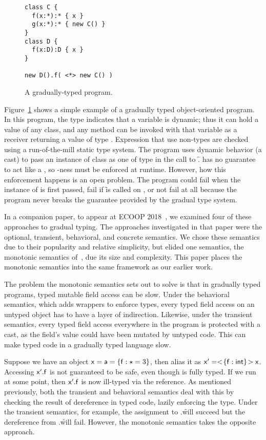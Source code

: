 \documentclass[sigconf]{acmart}
\begin{document}
\begin{figure}[h]
\begin{lstlisting}
class C { 
  f(x:*):* { x } 
  g(x:*):* { new C() }
}
class D { 
  f(x:D):D { x }
}

new D().f( <*> new C() )
\end{lstlisting}
\caption{A gradually-typed program.}
\label{fig:simpleprog}
\end{figure}

Figure~\ref{fig:simpleprog} shows a simple example of a gradually typed
object-oriented program. In this program, the type \any indicates that a
variable is dynamic; thus it can hold a value of any class, and any method
can be invoked with that variable as a receiver returning a value of type
\any. Expression that use non-\any types are checked using a run-of-the-mill
static type system. The program uses dynamic behavior (a cast) to pass an
instance of class \C as one of type \D in the call to \f. \C has no
guarantee to act like a \D, so \D-ness must be enforced at runtime. However,
how this enforcement happens is an open problem. The program could fail when
the instance of \C is first passed, fail if \f is called on \x, or not fail
at all because the program never breaks the guarantee provided by the
gradual type system.

In a companion paper, to appear at ECOOP 2018~\cite{us}, we examined four of
these approaches to gradual typing.  The approaches investigated in that
paper were the optional, transient, behavioral, and concrete semantics. We
chose these semantics due to their popularity and relative simplicity, but
elided one semantics, the monotonic semantics of~\cite{}, due its size and
complexity. This paper places the monotonic semantics into the same
framework as our earlier work.

The problem the monotonic semantics sets out to solve is that in gradually
typed programs, typed mutable field access can be slow. Under the behavioral
semantics, which adds wrappers to enforce types, every typed field access on
an untyped object has to have a layer of indirection. Likewise, under the
transient semantics, every typed field access everywhere in the program is
protected with a cast, as the field's value could have been mutated by untyped
code. This can make typed code in a gradually typed language slow.

Suppose we have an object $\x = \a = \{ \f:\any = 3 \}$, then alias it as
$\xp = \SubCast{\{ \f:\xt{int} \}}\x$. Accessing $\xp.\f$ is not guaranteed
to be safe, even though \xp is fully typed. If we run  at
some point, then $\xp.\f$ is now ill-typed via the  reference. As mentioned
previously, both the transient and behavioral semantics deal with this by
checking the result of dereference in typed code, lazily enforcing the type.
Under the transient semantics, for example, the assignment to \x.\f will
succeed but the dereference from \xp.\f will fail. However, the monotonic
semantics takes the opposite approach.
\end{document}
